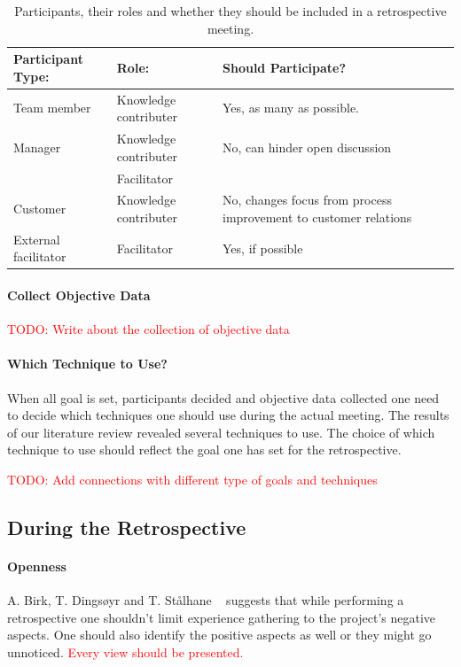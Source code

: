 \documentclass[12pt]{article}
\newcommand\todo[1]{\textcolor{red}{#1}}
\begin{document}
\begin{table}[!h]
	\centering
	\captionsetup{justification=centering}
	\caption{Participants, their roles and whether they should be included in a retrospective meeting.}
	\label{table:participants}
	\begin{tabular}{| l | l | p{} |}
		\hline
		Participant Type: & Role: & Should Participate?\\ \hline
		Team member & Knowledge contributer & Yes, as many as possible. \\ \hline
		Manager & Knowledge contributer & No, can hinder open discussion \\
		& Facilitator & \\ \hline
		Customer & Knowledge contributer & No, changes focus from process improvement to customer relations \\ \hline
		External facilitator & Facilitator & Yes, if possible \\ 
		\hline
	\end{tabular}
\end{table}

\paragraph{Collect Objective Data}

\todo{TODO: Write about the collection of objective data}

\paragraph{Which Technique to Use?} \label{subsec:which-techniques}
When all goal is set, participants decided and objective data collected one need to decide which techniques one should use during the actual meeting. The results of our literature review revealed several techniques to use. The choice of which technique to use should reflect the goal one has set for the retrospective. 

\todo{TODO: Add connections with different type of goals and techniques}

\subsection{During the Retrospective}

\paragraph{Openness}
A. Birk, T. Dingsøyr and T. Stålhane ~\cite{Birk2002} suggests that while performing a retrospective one shouldn't limit experience gathering to the project's negative aspects. One should also identify the positive aspects as well or they might go unnoticed. 
\todo{Every view should be presented.}
\end{document}
